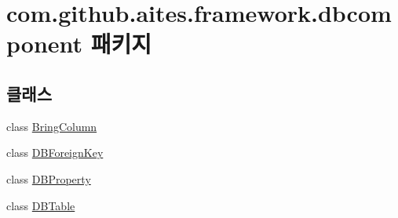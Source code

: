 \hypertarget{namespacecom_1_1github_1_1aites_1_1framework_1_1dbcomponent}{}\section{com.\+github.\+aites.\+framework.\+dbcomponent 패키지}
\label{namespacecom_1_1github_1_1aites_1_1framework_1_1dbcomponent}
\subsection*{클래스}
\begin{DoxyCompactItemize}
\item 
class \mbox{\hyperlink{classcom_1_1github_1_1aites_1_1framework_1_1dbcomponent_1_1_bring_column}{Bring\+Column}}
\item 
class \mbox{\hyperlink{classcom_1_1github_1_1aites_1_1framework_1_1dbcomponent_1_1_d_b_foreign_key}{D\+B\+Foreign\+Key}}
\item 
class \mbox{\hyperlink{classcom_1_1github_1_1aites_1_1framework_1_1dbcomponent_1_1_d_b_property}{D\+B\+Property}}
\item 
class \mbox{\hyperlink{classcom_1_1github_1_1aites_1_1framework_1_1dbcomponent_1_1_d_b_table}{D\+B\+Table}}
\end{DoxyCompactItemize}
